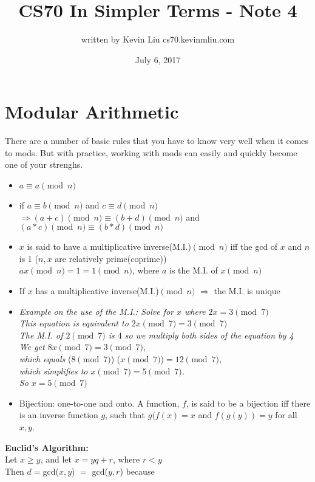 \documentclass[a4paper]{article}
\title{CS70 In Simpler Terms - Note 4}
\author{written by Kevin Liu cs70.kevinmliu.com}
\date{July 6, 2017}
\begin{document}
\maketitle

\section{Modular Arithmetic}
There are a number of basic rules that you have to know very well when it comes to mods. But with practice, working with mods can easily and quickly become one of your strenghs.
\begin{itemize}
    \item $a \equiv a\pmod n$
    \item if $a \equiv b \pmod n$ and $c \equiv d \pmod n$ \\
            $\Rightarrow (a+c)\pmod n \equiv (b+d)\pmod n$ and \\
            $(a*c)\pmod n \equiv (b*d)\pmod n$
    \item $x$ is said to have a multiplicative inverse(M.I.)$\pmod n$ iff the gcd of $x$ and $n$ is 1 ($n, x$ are relatively prime(coprime))\\
    $ax\pmod n = 1 = 1\pmod n$, where $a$ is the M.I. of $x\pmod n$
    \item If $x$ has a multiplicative inverse(M.I.)$\pmod n$ $\Rightarrow$ the M.I. is unique
    \item \textit{Example on the use of the M.I.: Solve for $x$ where $2x = 3\pmod 7$\\ This equation is equivalent to $2x\pmod 7 = 3\pmod 7$\\ The M.I. of $2\pmod 7$ is $4$ so we multiply both sides of the equation by 4\\ We get $8x\pmod 7 = 3\pmod 7$,\\ which equals} ($8\pmod 7$) ($x\pmod 7$)\textit{$= 12\pmod 7$, \\
    which simplifies to $x\pmod 7 = 5\pmod 7$. \\So $x=5\pmod 7$}
    \item Bijection: one-to-one and onto. A function, $f$, is said to be a bijection iff there is an inverse function $g$, such that $g(f(x) = x$ and $f(g(y)) = y$ for all $x,y$.

\end{itemize}
\textbf{Euclid's Algorithm:} \\
Let $x \geq y$, and let $x = yq + r$, where $r < y$\\ Then $d=$gcd($x,y$) $=$ gcd($y,r$) because\\
\end{document}
